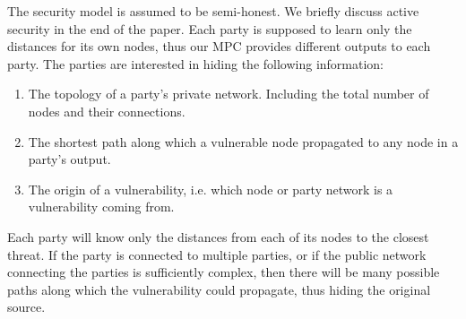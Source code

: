 The security model is assumed to be semi-honest\cite{security}. We briefly discuss active security in the end of the paper. Each party is supposed to learn only the distances for its own nodes, thus our MPC provides different outputs to each party. The parties are interested in hiding the following information: \begin{enumerate}
\item The topology of a party's private network. Including the total number of nodes and their connections.
\item The shortest path along which a vulnerable node propagated to any node in a party's output.
\item The origin of a vulnerability, i.e. which node or party network is a vulnerability coming from.
\end{enumerate}

Each party will know only the distances from each of its nodes to the closest threat. If the party is connected to multiple parties, or if the public network connecting the parties is sufficiently complex, then there will be many possible paths along which the vulnerability could propagate, thus hiding the original source.